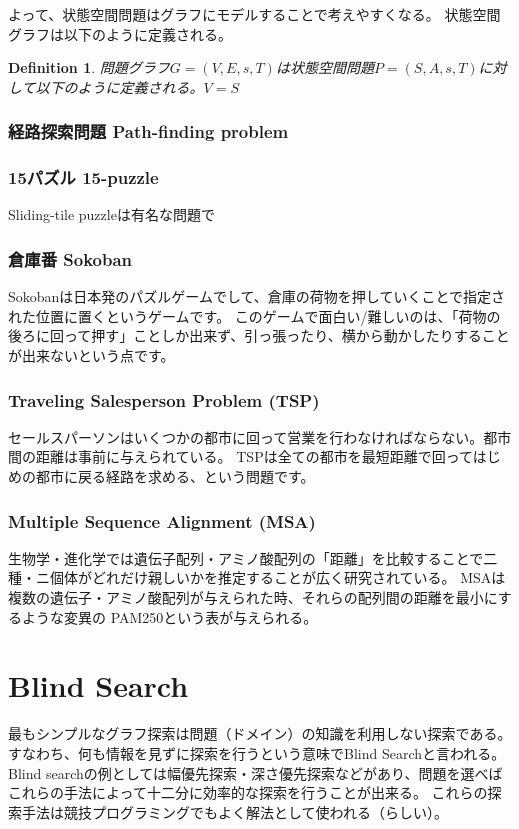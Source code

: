 \documentclass{book}
\newtheorem{definition}{Definition}
\begin{document}
よって、状態空間問題はグラフにモデルすることで考えやすくなる。
状態空間グラフは以下のように定義される。

\begin{definition}
問題グラフ$G = (V, E, s, T)$は状態空間問題$P = (S, A, s, T)$に対して以下のように定義される。$V = S$
\end{definition}




\subsection{経路探索問題 Path-finding problem}

\subsection{15パズル 15-puzzle}

Sliding-tile puzzleは有名な問題で

\subsection{倉庫番 Sokoban}
Sokobanは日本発のパズルゲームでして、倉庫の荷物を押していくことで指定された位置に置くというゲームです。
このゲームで面白い/難しいのは、「荷物の後ろに回って押す」ことしか出来ず、引っ張ったり、横から動かしたりすることが出来ないという点です。

\subsection{Traveling Salesperson Problem (TSP)}

セールスパーソンはいくつかの都市に回って営業を行わなければならない。都市間の距離は事前に与えられている。
TSPは全ての都市を最短距離で回ってはじめの都市に戻る経路を求める、という問題です。

\subsection{Multiple Sequence Alignment (MSA)}

生物学・進化学では遺伝子配列・アミノ酸配列の「距離」を比較することで二種・ニ個体がどれだけ親しいかを推定することが広く研究されている。
MSAは複数の遺伝子・アミノ酸配列が与えられた時、それらの配列間の距離を最小にするような変異の
PAM250という表が与えられる。

\chapter{Blind Search}
\label{ch:blind-search}
最もシンプルなグラフ探索は問題（ドメイン）の知識を利用しない探索である。
すなわち、何も情報を見ずに探索を行うという意味でBlind Searchと言われる。
Blind searchの例としては幅優先探索・深さ優先探索などがあり、問題を選べばこれらの手法によって十二分に効率的な探索を行うことが出来る。
これらの探索手法は競技プログラミングでもよく解法として使われる（らしい）。
\end{document}
